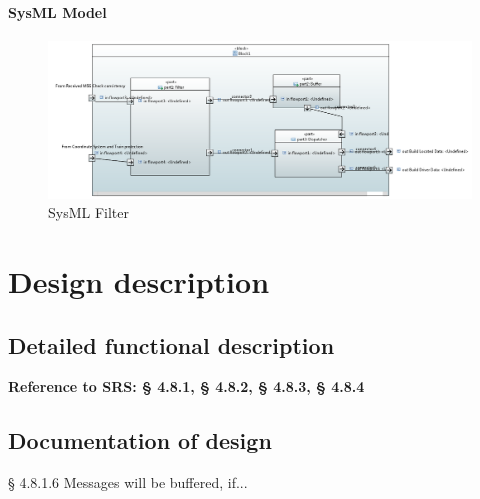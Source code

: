 \documentclass{template/openetcs_report}
\begin{document}
\subsubsection{SysML Model}
\begin{figure}[hbtp]
\centering
\includegraphics [scale=0.5]{images/SysMLFilter}
\caption{SysML Filter}
\end{figure}

\chapter{Design description}


\section{Detailed functional description}
\textbf{Reference to \gls{SRS}: § 4.8.1, § 4.8.2, § 4.8.3, § 4.8.4}\\

\section{Documentation of design}
§ 4.8.1.6 Messages will be buffered, if...\\
\end{document}
